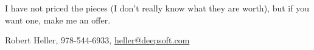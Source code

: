 \documentclass[12pt]{article}
\begin{document}
I have not priced the pieces (I don't really know what they are worth), but if 
you want one, make me an offer.

Robert Heller, 978-544-6933, \url{heller@deepsoft.com}









%
\end{document}
